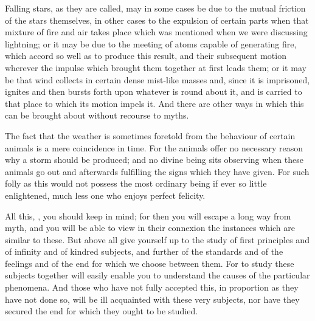 \documentclass{stex}
\begin{document}
Falling stars, as they are called, may in some cases be due to the mutual friction of the stars themselves, in other cases to the expulsion of certain parts when that mixture of fire and air takes place which was mentioned when we were discussing lightning; or it may be due to the meeting of atoms capable of generating fire, which accord so well as to produce this result, and their subsequent motion wherever the impulse which brought them together at first leads them; or it may be that wind collects in certain dense mist-like masses and, since it is imprisoned, ignites and then bursts forth upon whatever is round about it, and is carried to that place to which its motion impels it.
And there are other ways in which this can be brought about without recourse to myths.

The fact that the weather is sometimes foretold from the behaviour of certain animals is a mere coincidence in time.
For the animals offer no necessary reason why a storm should be produced; and no divine being sits observing when these animals go out and afterwards fulfilling the signs which they have given.
For such folly as this would not possess the most ordinary being if ever so little enlightened, much less one who enjoys perfect felicity.

All this, , you should keep in mind; for then you will escape a long way from myth, and you will be able to view in their connexion the instances which are similar to these.
But above all give yourself up to the study of first principles and of infinity and of kindred subjects, and further of the standards and of the feelings and of the end for which we choose between them.
For to study these subjects together will easily enable you to understand the causes of the particular phenomena.
And those who have not fully accepted this, in proportion as they have not done so, will be ill acquainted with these very subjects, nor have they secured the end for which they ought to be studied.
\end{document}

